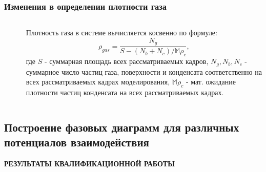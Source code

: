 \documentclass[pdf,hyperref={unicode}]{beamer}
\begin{document}
\begin{frame}
\transdissolve[duration=0.2]
\frametitle{Изменения в определении плотности газа}
\begin{columns}


\begin{column}{0.55\linewidth}

\begin{figure}[h]
\end{figure}

\end{column}

\begin{column}{0.4\linewidth}

\tiny{
Плотность газа в системе вычисляется косвенно по формуле:
\begin{equation}
\rho_{gas} = \frac{N_{g}}{S - (N_{b} + N_{c}) / \mathbb{M}\rho_c},
\label{eqGas}
\end{equation}
где $S$ - суммарная площадь всех рассматриваемых кадров, $N_g, N_b, N_c$ - суммарное число частиц газа, поверхности и конденсата соответственно на всех рассматриваемых кадрах моделирования, $\mathbb{M}\rho_c$ - мат. ожидание плотности частиц конденсата на всех рассматриваемых кадрах.
}

\end{column}

\end{columns}
\end{frame}



\subsection{Построение фазовых диаграмм для различных потенциалов взаимодействия}

\begin{frame}
\begin{center}
\vspace{5mm}
\textbf{РЕЗУЛЬТАТЫ КВАЛИФИКАЦИОННОЙ РАБОТЫ}
\end{center}
\end{frame}
\end{document}
